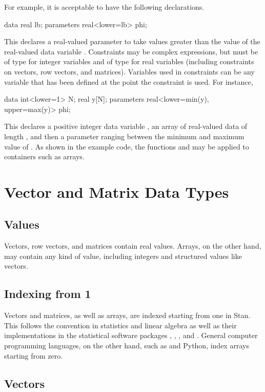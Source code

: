 For example, it is acceptable to have the
following declarations.
%
\begin{stancode}
data {
 real lb;
}
parameters {
   real<lower=lb> phi;
}
\end{stancode}
%
This declares a real-valued parameter  to take values
greater than the value of the real-valued data variable .
Constraints may be complex expressions, but must be of type 
for integer variables and of type  for real variables
(including constraints on vectors, row vectors, and matrices).
Variables used in constraints can be any variable that has been
defined at the point the constraint is used.  For instance,
\begin{stancode}
data {
   int<lower=1> N;
   real y[N];
}
parameters {
   real<lower=min(y), upper=max(y)> phi;
}
\end{stancode}
%
This declares a positive integer data variable , an array
 of real-valued data of length , and then a parameter
ranging between the minimum and maximum value of .  As shown
in the example code, the functions  and  may
be applied to containers such as arrays.


\section{Vector and Matrix Data Types}

\subsection{Values}

Vectors, row vectors, and matrices contain real values.  Arrays, on
the other hand, may contain any kind of value, including integers and
structured values like vectors.

\subsection{Indexing from 1}

Vectors and matrices, as well as arrays, are indexed starting from one
in Stan.  This follows the convention in statistics and linear
algebra as well as their implementations in the statistical software
packages \R, \MATLAB, \BUGS, and \JAGS.  General computer programming
languages, on the other hand, such as \Cpp and Python, index arrays
starting from zero.


\subsection{Vectors}


